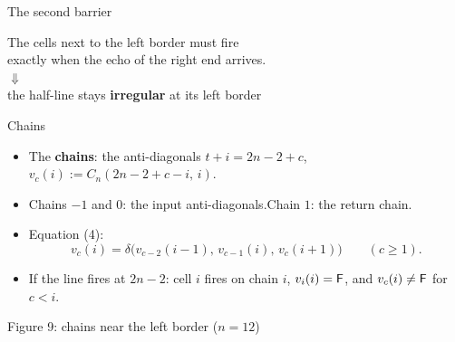 
\begin{frame}{The second barrier}
\vspace{5ex}
\begin{center}\Large
The cells next to the left border must fire\\ exactly when the echo of the right end arrives.\\[3ex]
\large$\Downarrow$\\[2ex]
the half-line stays \textbf{irregular} at its left border
\end{center}
\end{frame}

\begin{frame}{Chains}
\begin{itemize}
\item The \textbf{chains}: the anti-diagonals $t+i=2n-2+c$,\quad $v_c(i):=C_n(2n-2+c-i,\,i)$.
\item Chains $-1$ and $0$: the input anti-diagonals.\quad Chain $1$: the return chain.
\item Equation (4):
\[v_c(i)=\delta\bigl(v_{c-2}(i-1),\,v_{c-1}(i),\,v_c(i+1)\bigr)\qquad(c\ge1).\]
\item If the line fires at $2n-2$: cell $i$ fires on chain $i$, $v_i(i)=\mathsf F$, and $v_c(i)\ne\mathsf F$ for $c<i$.
\end{itemize}
\end{frame}

\begin{frame}{Figure 9: chains near the left border ($n=12$)}
\centering\fig[0.78]{}
\end{frame}

